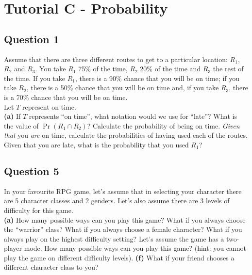 
\newpage
\section{Tutorial C - Probability}	
\subsection*{Question 1}
Assume that there are three different routes to get to a particular location: $R_1$, $R_2$ and $R_3$. You take $R_1$ 75\% of the time, $R_2$ 20\% of the time and $R_3$ the rest of the time. If you take $R_1$, there is a 90\% chance that you will be on time; if you take $R_2$, there is a 50\% chance that you will be on time and, if you take $R_3$, there is a 70\% chance that you will be on time. \\[0.1cm]
Let $T$ represent on time.\\[-0.2cm]

{\bf(a)} If $T$ represents ``on time'', what notation would we use for ``late''?  What is the value of $\Pr(R_1 \cap R_2)$?  Calculate the probability of being on time.  \emph{Given that} you \emph{are} on time, calculate the probabilities of having used each of the routes.  Given that you are late, what is the probability that you used $R_1$?






\subsection*{Question 5}
In your favourite RPG game, let's assume that in selecting your character there are 5 character classes and 2 genders. Let's also assume there are 3 levels of difficulty for this game.\\[-0.2cm]

{\bf(a)} How many possible ways can you play this game?  What if you always choose the ``warrior'' class?  What if you always choose a female character?  What if you always play on the highest difficulty setting?  Let's assume the game has a two-player mode. How many possible ways can you play this game? (hint: you cannot play the game on different difficulty levels). {\bf(f)} What if your friend chooses a different character class to you?

